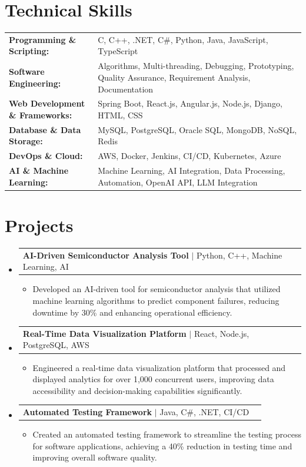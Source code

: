 \documentclass[letterpaper,10pt]{article}
\makeatletter
\newcommand{\resumeItem}[1]{
  \item{\fontsize{8pt}{9pt}\selectfont
    #1 \vspace{-3pt}
  }
}
\newcommand{\resumeProjectHeading}[2]{
    \item
    \begin{tabular*}{1.001\textwidth}{l@{\extracolsep{\fill}}r}
      \fontsize{8.5pt}{10pt}#1 & \textbf{\fontsize{8.5pt}{10pt} #2}\\
    \end{tabular*}\vspace{-7pt}
}
\newcommand{\resumeSubHeadingListStart}{\begin{itemize}[leftmargin=0pt, label={}]}
\newcommand{\resumeSubHeadingListEnd}{\end{itemize}}
\newcommand{\resumeItemListStart}{\begin{itemize}[leftmargin=*]}
\newcommand{\resumeItemListEnd}{\end{itemize}\vspace{-5pt}}
\makeatother
\begin{document}
\section{Technical Skills}
        \vspace{-14pt}
        \begin{table}[h]
            \fontsize{8pt}{9pt}\selectfont
            \begin{tabular}{p{0.3\linewidth} p{0.7\linewidth}}
                \textbf{Programming \& Scripting:} & C, C++, .NET, C#, Python, Java, JavaScript, TypeScript \\
                \textbf{Software Engineering:} & Algorithms, Multi-threading, Debugging, Prototyping, Quality Assurance, Requirement Analysis, Documentation \\
                \textbf{Web Development \& Frameworks:} & Spring Boot, React.js, Angular.js, Node.js, Django, HTML, CSS \\
                \textbf{Database \& Data Storage:} & MySQL, PostgreSQL, Oracle SQL, MongoDB, NoSQL, Redis \\
                \textbf{DevOps \& Cloud:} & AWS, Docker, Jenkins, CI/CD, Kubernetes, Azure \\
                \textbf{AI \& Machine Learning:} & Machine Learning, AI Integration, Data Processing, Automation, OpenAI API, LLM Integration \\
            \end{tabular}
        \end{table}
 \vspace{-18pt}

\section{Projects}
    \vspace{-5pt}
    \resumeSubHeadingListStart
          \resumeProjectHeading
            {\textbf{AI-Driven Semiconductor Analysis Tool} $|$ Python, C++, Machine Learning, AI}{}
            \resumeItemListStart
                \resumeItem{Developed an AI-driven tool for semiconductor analysis that utilized machine learning algorithms to predict component failures, reducing downtime by 30\% and enhancing operational efficiency.}
            \resumeItemListEnd
        \vspace{-12pt}
    
        \resumeProjectHeading
            {\textbf{Real-Time Data Visualization Platform} $|$ React, Node.js, PostgreSQL, AWS}{}
        \resumeItemListStart
                \resumeItem{Engineered a real-time data visualization platform that processed and displayed analytics for over 1,000 concurrent users, improving data accessibility and decision-making capabilities significantly.}
        \resumeItemListEnd
      \vspace{-12pt}
      \resumeProjectHeading
        {\textbf{Automated Testing Framework} $|$ Java, C#, .NET, CI/CD}{}
    \resumeItemListStart
            \resumeItem{Created an automated testing framework to streamline the testing process for software applications, achieving a 40\% reduction in testing time and improving overall software quality.}
    \resumeItemListEnd
    \resumeSubHeadingListEnd
\end{document}

